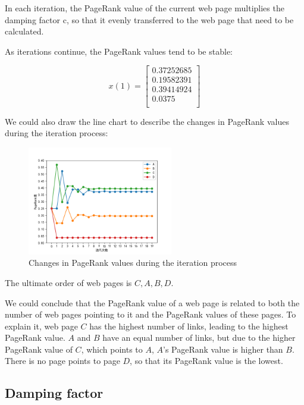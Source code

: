 \documentclass[lettersize,journal,12pt,conference]{IEEEtran}
\begin{document}
In each iteration, the PageRank value of the current web page multiplies the damping factor c, so that it evenly transferred to the web page that need to be calculated.

As iterations continue, the PageRank values tend to be stable:

\begin{equation}
	\label{eq:16}
	x(1) = \begin{bmatrix}
		0.37252685 \\
		0.19582391 \\
		0.39414924 \\
		0.0375     \\
	\end{bmatrix}
\end{equation}

We could also draw the line chart to describe the changes in PageRank values during the iteration process:

\begin{figure}[h]
	\centering
	\includegraphics[width=2.5in]{images/fig7.png}
	\caption{Changes in PageRank values during the iteration process}
	\label{fig7}
\end{figure}

The ultimate order of web pages is $C, A, B, D$.

We could conclude that the PageRank value of a web page is related to both the number of web pages pointing to it and the PageRank values of these pages. To explain it, web page $C$ has the highest number of links, leading to the highest PageRank value. $A$ and $B$ have an equal number of links, but due to the higher PageRank value of $C$, which points to $A$, $A$'s PageRank value is higher than $B$. There is no page points to page $D$, so that its PageRank value is the lowest.

\subsection{Damping factor}
\end{document}
